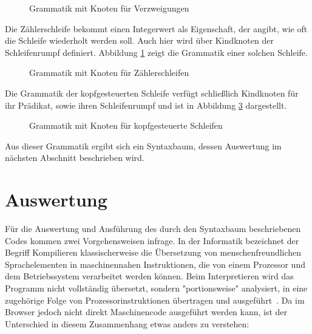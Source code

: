 \begin{figure}[h]
  
  \caption{Grammatik mit Knoten für Verzweigungen}
  \label{fig:implementation:grammar:6}
\end{figure}

Die Zählerschleife bekommt einen Integerwert als Eigenschaft, der angibt, wie oft die Schleife wiederholt werden soll. Auch hier wird über Kindknoten der Schleifenrumpf definiert. Abbildung \ref{fig:implementation:grammar:6} zeigt die Grammatik einer solchen Schleife.

\begin{figure}[h]
  
  \caption{Grammatik mit Knoten für Zählerschleifen}
  \label{fig:implementation:grammar:7}
\end{figure}

Die Grammatik der kopfgesteuerten Schleife verfügt schließlich Kindknoten für ihr Prädikat, sowie ihren Schleifenrumpf und ist in Abbildung \ref{fig:implementation:grammar:8} dargestellt.

\begin{figure}[h]
  
  \caption{Grammatik mit Knoten für kopfgesteuerte Schleifen}
  \label{fig:implementation:grammar:8}
\end{figure}

Aus dieser Grammatik ergibt sich ein Syntaxbaum, dessen Auswertung im nächsten Abschnitt beschrieben wird.

\section{Auswertung}
\label{sec:implementation:evaluation}

Für die Auswertung und Ausführung des durch den Syntaxbaum beschriebenen Codes kommen zwei Vorgehensweisen infrage. In der Informatik bezeichnet der Begriff Kompilieren klassischerweise die Übersetzung von menschenfreundlichen Sprachelementen in maschinennahen Instruktionen, die von einem Prozessor und dem Betriebssystem verarbeitet werden können. Beim Interpretieren wird das Programm nicht vollständig übersetzt, sondern "portionsweise" analysiert, in eine zugehörige Folge von Prozessorinstruktionen übertragen und ausgeführt~\cite[47]{wagenknecht2009}. Da im Browser jedoch nicht direkt Maschinencode ausgeführt werden kann, ist der Unterschied in diesem Zusammenhang etwas anders zu verstehen:

